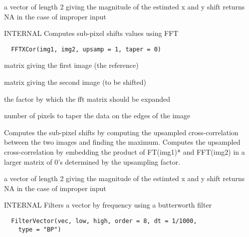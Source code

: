 \documentclass[a4paper]{book}
\begin{document}
%
\begin{Value}
a vector of length 2 giving the magnitude of the estimted
x and y shift returns NA in the case of improper input
\end{Value}
%
\begin{Description}\relax
INTERNAL Computes sub-pixel shifts values using FFT
\end{Description}
%
\begin{Usage}
\begin{verbatim}
  FFTXCor(img1, img2, upsamp = 1, taper = 0)
\end{verbatim}
\end{Usage}
%
\begin{Arguments}
\begin{ldescription}
\item[\code{img1}] matrix giving the first image (the
reference)

\item[\code{img2}] matrix giving the second image (to be
shifted)

\item[\code{upsamp}] the factor by which the fft matrix should
be expanded

\item[\code{taper}] number of pixels to taper the data on the
edges of the image
\end{ldescription}
\end{Arguments}
%
\begin{Details}\relax
Computes the sub-pixel shifts by computing the upsampled
cross-correlation between the two images and finding the
maximum. Computes the upsampled cross-correlation by
embedding the product of FT(img1)* and FFT(img2) in a
larger matrix of 0's determined by the upsampling factor.
\end{Details}
%
\begin{Value}
a vector of length 2 giving the magnitude of the estimted
x and y shift returns NA in the case of improper input
\end{Value}
%
\begin{Description}\relax
INTERNAL Filters a vector by frequency using a
butterworth filter
\end{Description}
%
\begin{Usage}
\begin{verbatim}
  FilterVector(vec, low, high, order = 8, dt = 1/1000,
    type = "BP")
\end{verbatim}
\end{Usage}
\end{document}
